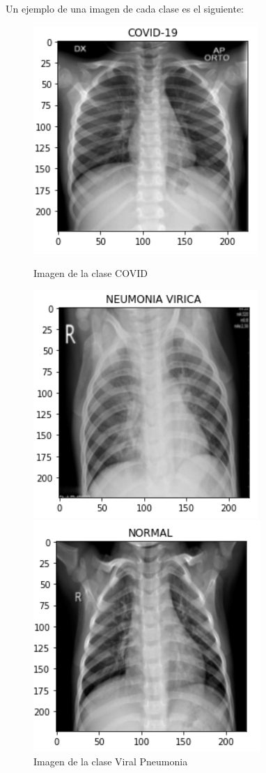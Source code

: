 \documentclass[11pt,a4paper]{article}
\theoremstyle{definition}
\begin{document}
Un ejemplo de una imagen de cada clase es el siguiente:

\begin{figure}[h]
  \centering
  \begin{minipage}[b]{0.25\textwidth}
    \includegraphics[scale=0.65]{./images/ejemploCOVID}
	\caption{Imagen de la clase COVID}
  \end{minipage}
  \hfill
  \begin{minipage}[b]{0.25\textwidth}
    \includegraphics[scale=0.65]{./images/ejemploNEUMONIAVIRICA}
	\caption{Imagen de la clase Viral Pneumonia}
  \end{minipage}
    \hfill
    \begin{minipage}[b]{0.25\textwidth}
    \includegraphics[scale=0.65]{./images/ejemploNORMAL}

\end{minipage}
\end{figure}
\end{document}
